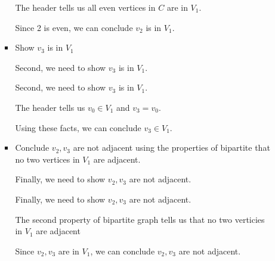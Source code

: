 \documentclass[12pt]{article}
\begin{document}
\begin{enumerate}[a.]
\begin{mdframed}
\begin{enumerate}[1.]
\begin{itemize}
\begin{mdframed}
                The header tells us all even vertices in $C$ are in $V_1$.

                \bigskip

                Since 2 is even, we can conclude $v_2$ is in $V_1$.
                \end{mdframed}

                \item Show $v_3$ is in $V_1$

                \bigskip

                Second, we need to show $v_3$ is in $V_1$.

                \bigskip

                \begin{mdframed}
                Second, we need to show $v_3$ is in $V_1$.

                \bigskip

                The header tells us $v_0 \in V_1$ and $v_3 = v_0$.

                \bigskip

                Using these facts, we can conclude $v_3 \in V_1$.

                \end{mdframed}

                \item Conclude $v_2,v_3$ are not adjacent using the properties of bipartite
                that no two vertices in $V_1$ are adjacent.

                \bigskip

                Finally, we need to show $v_2, v_3$ are not adjacent.

                \bigskip

                \begin{mdframed}
                Finally, we need to show $v_2, v_3$ are not adjacent.

                \bigskip

                The second property of bipartite graph tells us that no two
                verticies in $V_1$ are adjacent

                \bigskip

                Since $v_2,v_3$ are in $V_1$, we can conclude $v_2,v_3$ are not
                adjacent.
                \end{mdframed}

                \begin{mdframed}


\end{mdframed}
\end{itemize}
\end{enumerate}
\end{mdframed}
\end{enumerate}
\end{document}

